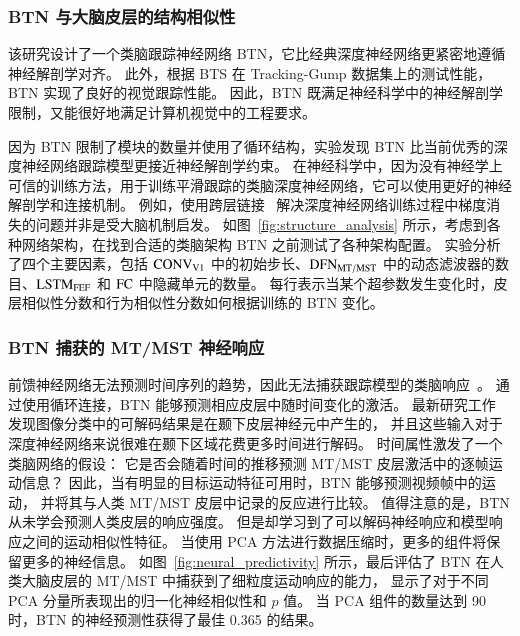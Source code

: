 \subsubsection{BTN 与大脑皮层的结构相似性}
该研究设计了一个类脑跟踪神经网络 BTN，它比经典深度神经网络更紧密地遵循神经解剖学对齐。
此外，根据 BTS 在 Tracking-Gump 数据集上的测试性能，BTN 实现了良好的视觉跟踪性能。
因此，BTN 既满足神经科学中的神经解剖学限制，又能很好地满足计算机视觉中的工程要求。

因为 BTN 限制了模块的数量并使用了循环结构，实验发现 BTN 比当前优秀的深度神经网络跟踪模型更接近神经解剖学约束。
在神经科学中，因为没有神经学上可信的训练方法，用于训练平滑跟踪的类脑深度神经网络，它可以使用更好的神经解剖学和连接机制。
例如，使用跨层链接~\cite{he2016deep} 解决深度神经网络训练过程中梯度消失的问题并非是受大脑机制启发。
如图~\ref{fig:structure_analysis} 所示，考虑到各种网络架构，在找到合适的类脑架构 BTN 之前测试了各种架构配置。
实验分析了四个主要因素，包括 $\rm{CONV_{V1}}$ 中的初始步长、$\rm{DFN_{MT/MST}}$ 中的动态滤波器的数目、$\rm{LSTM_{FEF}}$ 和 $\rm{FC}$ 中隐藏单元的数量。
每行表示当某个超参数发生变化时，皮层相似性分数和行为相似性分数如何根据训练的 BTN 变化。

\subsubsection{BTN 捕获的 MT/MST 神经响应}
\label{sec:capture_neural}

前馈神经网络无法预测时间序列的趋势，因此无法捕获跟踪模型的类脑响应~\cite{kar2019evidence, TangSchrimpfLotter2018Recurrent}。
通过使用循环连接，BTN 能够预测相应皮层中随时间变化的激活。
最新研究工作~\cite{kar2019evidence} 发现图像分类中的可解码结果是在颞下皮层神经元中产生的，
并且这些输入对于深度神经网络来说很难在颞下区域花费更多时间进行解码。
时间属性激发了一个类脑网络的假设：
它是否会随着时间的推移预测 MT/MST 皮层激活中的逐帧运动信息？
因此，当有明显的目标运动特征可用时，BTN 能够预测视频帧中的运动，
并将其与人类 MT/MST 皮层中记录的反应进行比较。
值得注意的是，BTN 从未学会预测人类皮层的响应强度。
但是却学习到了可以解码神经响应和模型响应之间的运动相似性特征。
当使用 PCA 方法进行数据压缩时，更多的组件将保留更多的神经信息。
如图~\ref{fig:neural_predictivity} 所示，最后评估了 BTN 在人类大脑皮层的 MT/MST 中捕获到了细粒度运动响应的能力，
显示了对于不同 PCA 分量所表现出的归一化神经相似性和 $p$ 值。
当 PCA 组件的数量达到 90 时，BTN 的神经预测性获得了最佳 0.365 的结果。


